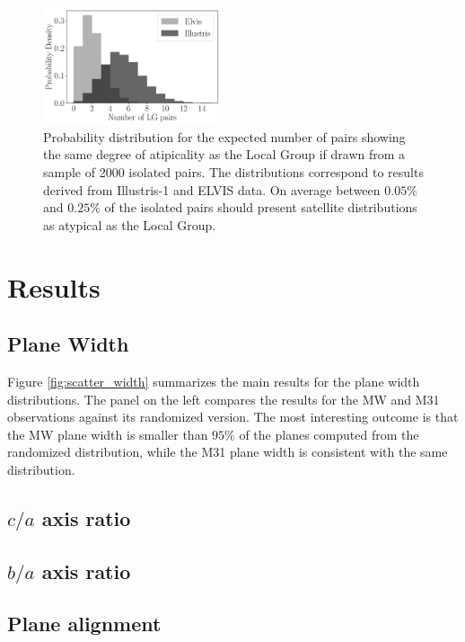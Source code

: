 \documentclass[a4paper,fleqn,usenatbib]{mnras}
\begin{document}
\begin{figure}
\centering
\includegraphics[width=0.47\textwidth]{expected_numbers.pdf}
\caption{Probability distribution for the expected number of pairs
  showing the same degree of atipicality as the Local Group if drawn
  from a sample of 2000 isolated pairs. 
  The distributions correspond to results derived from Illustris-1
  and ELVIS data.
  On average between $0.05\%$ and $0.25\%$ of the isolated pairs should present
  satellite distributions as atypical as the Local Group.
\label{fig:expected_number}}
\end{figure}

\section{Results}
\label{sec:results}


\subsection{Plane Width}

Figure \ref{fig:scatter_width} summarizes the main results for the plane
width distributions.
The panel on the left compares the results for the MW and M31
observations against its randomized version. 
The most interesting outcome is that the MW plane width is smaller
than $95\%$ of the planes computed from the randomized distribution,
while the M31 plane width is consistent with the same distribution. 

\subsection{$c/a$ axis ratio}

\subsection{$b/a$ axis ratio}

\subsection{Plane alignment}
\end{document}
